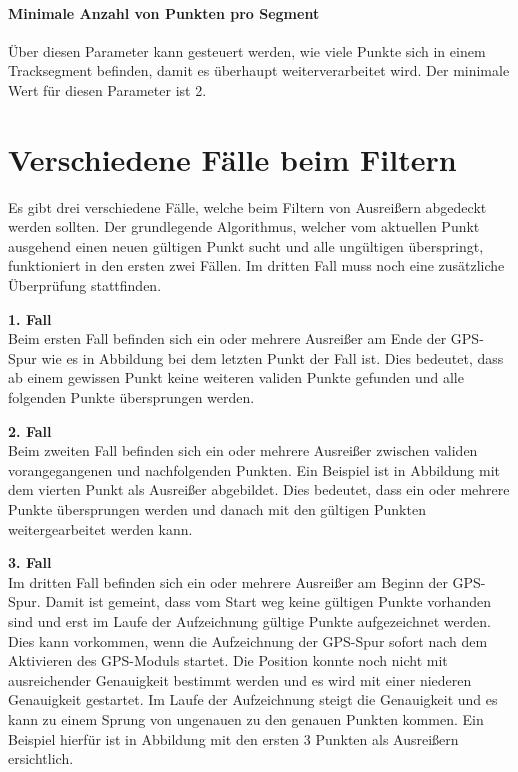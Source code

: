 \paragraph{Minimale Anzahl von Punkten pro Segment} Über diesen Parameter kann gesteuert werden, wie viele Punkte sich in einem Tracksegment befinden, damit es überhaupt weiterverarbeitet wird. Der minimale Wert für diesen Parameter ist 2. 

\section*{Verschiedene Fälle beim Filtern}
Es gibt drei verschiedene Fälle, welche beim Filtern von Ausreißern abgedeckt werden sollten. Der grundlegende Algorithmus, welcher vom aktuellen Punkt ausgehend einen neuen gültigen Punkt sucht und alle ungültigen überspringt, funktioniert in den ersten zwei Fällen. Im dritten Fall muss noch eine zusätzliche Überprüfung stattfinden.

\textbf{1. Fall}\\
Beim ersten Fall befinden sich ein oder mehrere Ausreißer am Ende der GPS-Spur wie es in Abbildung  bei dem letzten Punkt der Fall ist. Dies bedeutet, dass ab einem gewissen Punkt keine weiteren validen Punkte gefunden und alle folgenden Punkte übersprungen werden.


\textbf{2. Fall}\\
Beim zweiten Fall befinden sich ein oder mehrere Ausreißer zwischen validen vorangegangenen und nachfolgenden Punkten. Ein Beispiel ist in Abbildung  mit dem vierten Punkt als Ausreißer abgebildet. Dies bedeutet, dass ein oder mehrere Punkte übersprungen werden und danach mit den gültigen Punkten weitergearbeitet werden kann.


\textbf{3. Fall}\\
Im dritten Fall befinden sich ein oder mehrere Ausreißer am Beginn der GPS-Spur. Damit ist gemeint, dass vom Start weg keine gültigen Punkte vorhanden sind und erst im Laufe der Aufzeichnung gültige Punkte aufgezeichnet werden. Dies kann vorkommen, wenn die Aufzeichnung der GPS-Spur sofort nach dem Aktivieren des GPS-Moduls startet. Die Position konnte noch nicht mit ausreichender Genauigkeit bestimmt werden und es wird mit einer niederen Genauigkeit gestartet. Im Laufe der Aufzeichnung steigt die Genauigkeit und es kann zu einem Sprung von ungenauen zu den genauen Punkten kommen. Ein Beispiel hierfür ist in Abbildung  mit den ersten 3 Punkten als Ausreißern ersichtlich.

